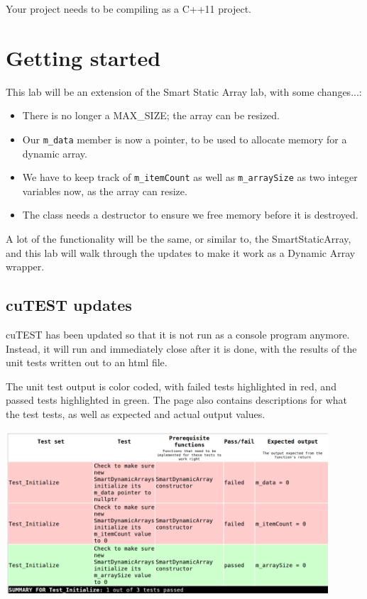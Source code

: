 \documentclass[a4paper,12pt]{book}
\begin{document}
Your project needs to be compiling as a C++11 project.

    \section*{Getting started}

        This lab will be an extension of the Smart Static Array lab,
        with some changes...:

        \begin{itemize}
            \item There is no longer a MAX\_SIZE; the array can be resized.
            \item Our \texttt{m\_data} member is now a pointer, to be used
                to allocate memory for a dynamic array.
            \item We have to keep track of \texttt{m\_itemCount} as well as
                \texttt{m\_arraySize} as two integer variables now, as the array can resize.
            \item The class needs a destructor to ensure we free memory before it is destroyed.
        \end{itemize}

        A lot of the functionality will be the same, or similar to, the
        SmartStaticArray, and this lab will walk through the updates
        to make it work as a Dynamic Array wrapper.

    \subsection*{cuTEST updates}

        cuTEST has been updated so that it is not run as a console program anymore.
        Instead, it will run and immediately close after it is done, with
        the results of the unit tests written out to an html file.

        The unit test output is color coded, with failed tests highlighted in red,
        and passed tests highlighted in green. The page also contains
        descriptions for what the test tests, as well as expected and actual output values.

        \begin{center}
            \includegraphics[width=12cm]{images/lab5-testoutput.png}
        \end{center}
\end{document}
